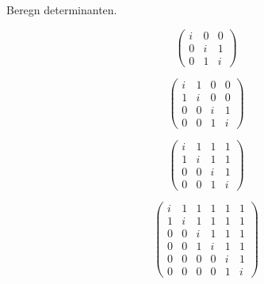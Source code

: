 \begin{oppgave}
Beregn determinanten.
\begin{punkt}
\[
\begin{pmatrix}
 i & 0 & 0 \\  0 & i & 1 \\  0& 1  &i  
\end{pmatrix}
\]
\end{punkt}
\begin{punkt}
\[
\begin{pmatrix}
i & 1 & 0 & 0 \\ 1 & i & 0 & 0 \\ 0 & 0 & i & 1 \\ 0 & 0& 1  &i  
\end{pmatrix}
\]
\end{punkt}

\begin{punkt}
\[
\begin{pmatrix}
i & 1 & 1 & 1  \\ 1 & i & 1 & 1 \\ 0 & 0 & i & 1 \\ 0 & 0& 1  &i 
\end{pmatrix}
\]
\end{punkt}

\begin{punkt}
\[
\begin{pmatrix}
i & 1 & 1 & 1 & 1 & 1 \\ 1 & i & 1 & 1 & 1 & 1\\ 0 & 0 & i & 1& 1 & 1 \\ 0 & 0& 1  &i & 1 & 1 \\ 0 & 0 & 0 & 0 & i & 1\\ 0 & 0 & 0 & 0 & 1 & i 
\end{pmatrix}
\]
\end{punkt}


\end{oppgave}
